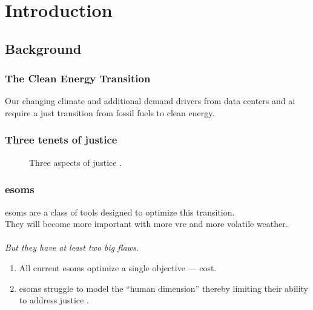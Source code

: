\section{Introduction}

\subsection{Background}
\begin{frame}
    \frametitle{The Clean Energy Transition}
    Our changing climate and additional demand drivers from data 
    centers and \gls{ai} require a just transition from fossil 
    fuels to clean energy.
\end{frame}

\begin{frame}
    \frametitle{Three tenets of justice}
    \begin{figure}
        \centering

        \caption{Three aspects of justice \cite{schlosberg_1_2007}.}
    \end{figure}
\end{frame}

\begin{frame}
    \frametitle{\glspl{esom}}
    \Glspl{esom} are a class of tools designed to 
    optimize this transition.
    \\

    They will become more important with more \gls{vre}
    and more volatile weather.
    \\\\
    \textit{But they have at least two big flaws}.
    \begin{enumerate}[<+->]
        \item All current \glspl{esom} optimize a single objective --- cost.
        \item \glspl{esom} struggle to model the ``human dimension'' thereby
        limiting their ability to address justice \cite{pfenninger_energy_2014}.
    \end{enumerate}
\end{frame}

